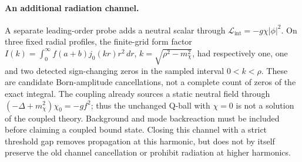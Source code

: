 \paragraph{An additional radiation channel.}
A separate leading-order probe adds a neutral scalar through
$\mathcal L_{\mathrm{int}}=-g\chi|\phi|^2$. On three fixed radial profiles,
the finite-grid form factor
$I(k)=\int_0^\infty f(a+b)j_0(kr)r^2\,dr$,
$k=\sqrt{\rho^2-m_\chi^2}$, had respectively one, one and two detected
sign-changing zeros in the sampled interval $0<k<\rho$.
These are candidate Born-amplitude cancellations, not a complete count
of zeros of the exact integral. The coupling already sources a static
neutral field through $(-\Delta+m_\chi^2)\chi_0=-gf^2$; thus the
unchanged Q-ball with $\chi=0$ is not a solution of the coupled theory.
Background and mode backreaction must be included before claiming a
coupled bound state. Closing this channel with a strict threshold gap
removes propagation at this harmonic, but does not by itself preserve
the old channel cancellation or prohibit radiation at higher harmonics.
